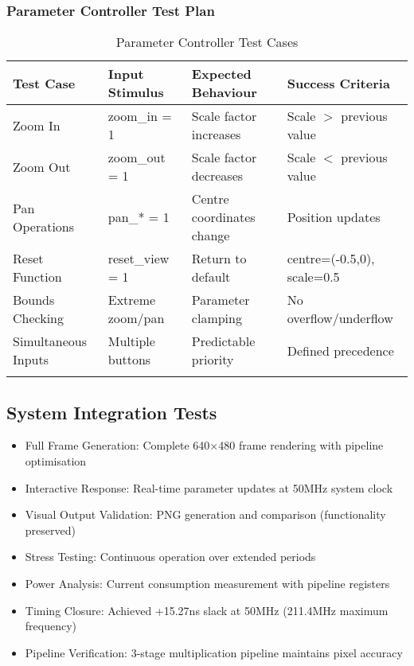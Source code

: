 \documentclass[11pt,a4paper]{article}
\begin{document}
\subsubsection{Parameter Controller Test Plan}
\begin{longtable}{|p{2cm}|p{2.5cm}|p{2.5cm}|p{4cm}|}
\hline
\rowcolor{orange!20}
\textbf{Test Case} & \textbf{Input Stimulus} & \textbf{Expected Behaviour} & \textbf{Success Criteria} \\
\hline
Zoom In & zoom\_in = 1 & Scale factor increases & Scale $>$ previous value \\
\hline
Zoom Out & zoom\_out = 1 & Scale factor decreases & Scale $<$ previous value \\
\hline
Pan Operations & pan\_* = 1 & Centre coordinates change & Position updates \\
\hline
Reset Function & reset\_view = 1 & Return to default & centre=(-0.5,0), scale=0.5 \\
\hline
Bounds Checking & Extreme zoom/pan & Parameter clamping & No overflow/underflow \\
\hline
Simultaneous Inputs & Multiple buttons & Predictable priority & Defined precedence \\
\hline
\caption{Parameter Controller Test Cases}
\end{longtable}

\subsection{System Integration Tests}
\begin{itemize}
\item Full Frame Generation: Complete 640×480 frame rendering with pipeline optimisation
\item Interactive Response: Real-time parameter updates at 50MHz system clock
\item Visual Output Validation: PNG generation and comparison (functionality preserved)
\item Stress Testing: Continuous operation over extended periods
\item Power Analysis: Current consumption measurement with pipeline registers
\item Timing Closure: Achieved +15.27ns slack at 50MHz (211.4MHz maximum frequency)
\item Pipeline Verification: 3-stage multiplication pipeline maintains pixel accuracy
\end{itemize}
\end{document}
